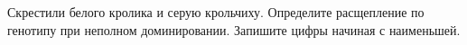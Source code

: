 Скрестили белого кролика и серую крольчиху. Определите расщепление по генотипу при неполном доминировании. Запишите цифры начиная с наименьшей. \\ 
